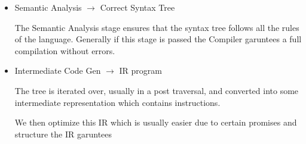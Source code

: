 \documentclass{report}
\begin{document}
\begin{itemize}
\begin{mdframed}
\begin{itemize}
                \item Semantic Analysis $\to$ Correct Syntax Tree
                    \begin{mdframed}
                        The Semantic Analysis stage ensures that the syntax tree
                        follows all the rules of the language. Generally if this
                        stage is passed the Compiler garuntees a full compilation
                        without errors.
                    \end{mdframed}
                \item Intermediate Code Gen $\to$ IR program
                    \begin{mdframed}
                        The tree is iterated over, usually in a post traversal, and converted
                        into some intermediate representation which contains instructions.

                        We then optimize this IR which is usually easier due to certain
                        promises and structure the IR garuntees
                    \end{mdframed}
            \end{itemize}
        \end{mdframed}
\end{itemize}
\end{document}

